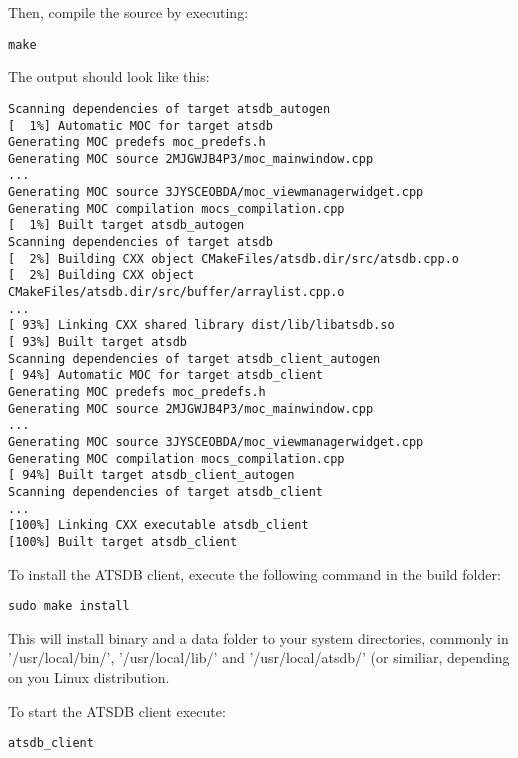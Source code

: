 Then, compile the source by executing:

\begin{verbatim}
make
\end{verbatim}

The output should look like this:

\begin{verbatim}
Scanning dependencies of target atsdb_autogen
[  1%] Automatic MOC for target atsdb
Generating MOC predefs moc_predefs.h
Generating MOC source 2MJGWJB4P3/moc_mainwindow.cpp
...
Generating MOC source 3JYSCEOBDA/moc_viewmanagerwidget.cpp
Generating MOC compilation mocs_compilation.cpp
[  1%] Built target atsdb_autogen
Scanning dependencies of target atsdb
[  2%] Building CXX object CMakeFiles/atsdb.dir/src/atsdb.cpp.o
[  2%] Building CXX object CMakeFiles/atsdb.dir/src/buffer/arraylist.cpp.o
...
[ 93%] Linking CXX shared library dist/lib/libatsdb.so
[ 93%] Built target atsdb
Scanning dependencies of target atsdb_client_autogen
[ 94%] Automatic MOC for target atsdb_client
Generating MOC predefs moc_predefs.h
Generating MOC source 2MJGWJB4P3/moc_mainwindow.cpp
...
Generating MOC source 3JYSCEOBDA/moc_viewmanagerwidget.cpp
Generating MOC compilation mocs_compilation.cpp
[ 94%] Built target atsdb_client_autogen
Scanning dependencies of target atsdb_client
...
[100%] Linking CXX executable atsdb_client
[100%] Built target atsdb_client
\end{verbatim}

To install the ATSDB client, execute the following command in the build folder:

\begin{verbatim}
sudo make install
\end{verbatim}

This will install binary and a data folder to your system directories, commonly in '/usr/local/bin/', '/usr/local/lib/' and '/usr/local/atsdb/' (or similiar, depending on you Linux distribution.

To start the ATSDB client execute:

\begin{verbatim}
atsdb_client
\end{verbatim} 
